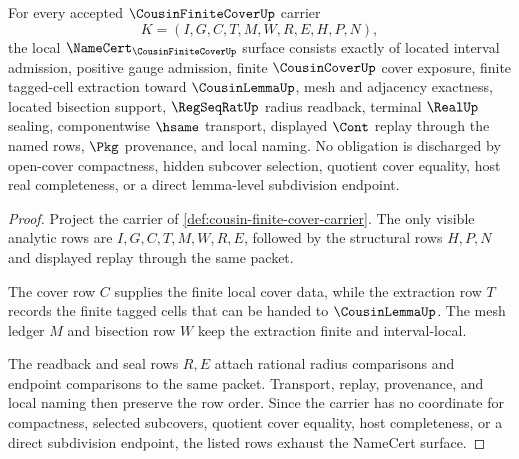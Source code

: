 \begin{theorem}
\label{thm:cousin-finite-cover-namecert-obligations}
For every accepted $\CousinFiniteCoverUp$ carrier
$$
K=(I,G,C,T,M,W,R,E,H,P,N),
$$
the local $\NameCert_{\CousinFiniteCoverUp}$ surface consists exactly of located interval admission, positive gauge admission, finite $\CousinCoverUp$ cover exposure, finite tagged-cell extraction toward $\CousinLemmaUp$, mesh and adjacency exactness, located bisection support, $\RegSeqRatUp$ radius readback, terminal $\RealUp$ sealing, componentwise $\hsame$ transport, displayed $\Cont$ replay through the named rows, $\Pkg$ provenance, and local naming. No obligation is discharged by open-cover compactness, hidden subcover selection, quotient cover equality, host real completeness, or a direct lemma-level subdivision endpoint.
\end{theorem}
\begin{proof}
Project the carrier of \autoref{def:cousin-finite-cover-carrier}. The only visible analytic rows are $I,G,C,T,M,W,R,E$, followed by the structural rows $H,P,N$ and displayed replay through the same packet.

The cover row $C$ supplies the finite local cover data, while the extraction row $T$ records the finite tagged cells that can be handed to $\CousinLemmaUp$. The mesh ledger $M$ and bisection row $W$ keep the extraction finite and interval-local.

The readback and seal rows $R,E$ attach rational radius comparisons and endpoint comparisons to the same packet. Transport, replay, provenance, and local naming then preserve the row order. Since the carrier has no coordinate for compactness, selected subcovers, quotient cover equality, host completeness, or a direct subdivision endpoint, the listed rows exhaust the NameCert surface.
\end{proof}

